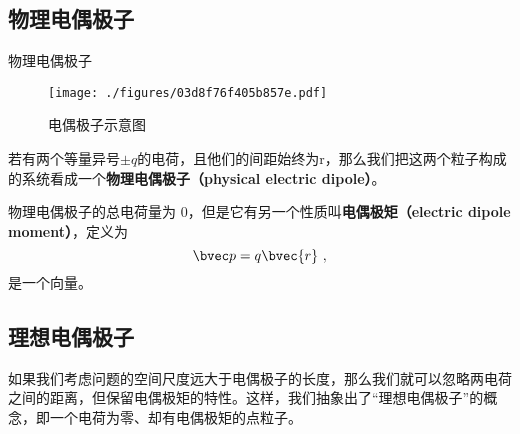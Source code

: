 


\subsection{物理电偶极子}



\begin{definition}{物理电偶极子}
\begin{figure}[ht]
\centering
\texttt{[image: ./figures/03d8f76f405b857e.pdf]}
\caption{电偶极子示意图} \label{fig_eleDpl_1}
\end{figure}
若有两个等量异号$\pm q$的电荷，且他们的间距始终为r，那么我们把这两个粒子构成的系统看成一个\textbf{物理电偶极子（physical electric dipole）}。

物理电偶极子的总电荷量为 $0$，但是它有另一个性质叫\textbf{电偶极矩（electric dipole moment）}，定义为 
\begin{equation}
\bvec p = q\bvec{r}~,
\end{equation}
是一个向量。
\end{definition}

\subsection{理想电偶极子}
如果我们考虑问题的空间尺度远大于电偶极子的长度，那么我们就可以忽略两电荷之间的距离，但保留电偶极矩的特性。这样，我们抽象出了“理想电偶极子”的概念，即一个电荷为零、却有电偶极矩的点粒子。


